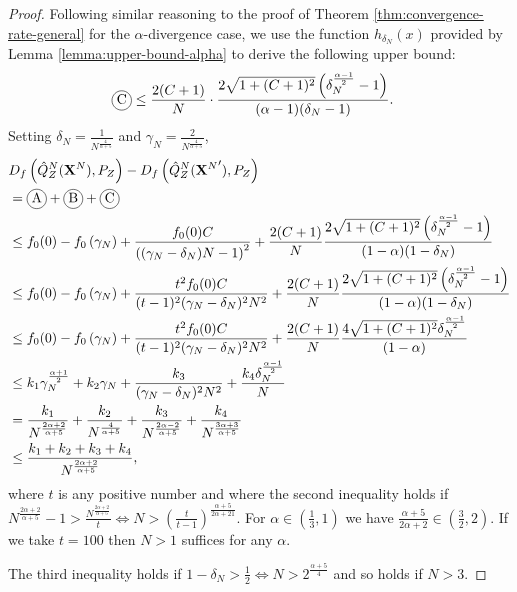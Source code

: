 \begin{proof}
Following similar reasoning to the proof of Theorem \ref{thm:convergence-rate-general} for the $\alpha$-divergence case, we use the function $h_{\delta_N}(x)$ provided by Lemma \ref{lemma:upper-bound-alpha} to derive the following upper bound:
%
\begin{align*}
    \encircle{C} &\leq \frac{2(C+1)}{N} \cdot \frac{2\sqrt{1+(C+1)^2}\left(\delta_N^\frac{\alpha-1}{2} - 1\right)}{(\alpha - 1) (\delta_N- 1)}.
\end{align*}
%
Setting $\delta_N = \frac{1}{N^\frac{4}{\alpha+5}}$ and $\gamma_N = \frac{2}{N^\frac{4}{\alpha+5}}$,
%
\begin{align*}
    &D_f\left( \hat{Q}_Z^N(\XN) , P_Z\right) - D_f\left( \hat{Q}_Z^N({\XN}') , P_Z\right) \\
    &= \encircle{A} + \encircle{B} + \encircle{C} \\
    &\leq f_0(0) - f_0\left(\gamma_N\right) + \frac{f_0(0)C}{\left((\gamma_N-\delta_N)N - 1\right)^2} + \frac{2(C+1)}{N}\frac{2\sqrt{1+(C+1)^2}\left(\delta_N^\frac{\alpha-1}{2} - 1\right)}{(1-\alpha) (1-\delta_N)} \\
    &\leq f_0(0) - f_0\left(\gamma_N\right) + \frac{t^2f_0(0)C}{(t-1)^2(\gamma_N-\delta_N)^2N^2} + \frac{2(C+1)}{N}\frac{2\sqrt{1+(C+1)^2}\left(\delta_N^\frac{\alpha-1}{2} - 1\right)}{(1-\alpha) (1-\delta_N)} \\
    &\leq f_0(0) - f_0\left(\gamma_N\right) + \frac{t^2f_0(0)C}{(t-1)^2(\gamma_N-\delta_N)^2N^2} + \frac{2(C+1)}{N}\frac{4\sqrt{1+(C+1)^2}\delta_N^\frac{\alpha-1}{2}}{(1-\alpha)} \\
    &\leq k_1 \gamma_N^{\frac{\alpha+1}{2}} + k_2 \gamma_N +\frac{k_3}{(\gamma_N-\delta_N)^2N^2} + \frac{k_4 \delta_N^\frac{\alpha-1}{2}}{N} \\
    &= \frac{k_1}{N^{\frac{2\alpha+2}{\alpha+5}}} + \frac{k_2}{N^\frac{4}{\alpha+5}} + \frac{k_3}{N^{\frac{2\alpha -2}{\alpha+5}}} +\frac{k_4}{N^{\frac{3\alpha+3}{\alpha+5}}} \\
    &\leq \frac{k_1+k_2+k_3 + k_4}{N^{\frac{2\alpha+2}{\alpha+5}}},
\end{align*}
where $t$ is any positive number and where the second inequality holds if $N^\frac{2\alpha+2}{\alpha+5} - 1 > \frac{N^\frac{2\alpha+2}{\alpha+5}}{t} \iff N > (\frac{t}{t-1})^{\frac{\alpha+5}{2\alpha+21}}$.
For $\alpha \in (\frac{1}{3}, 1)$ we have $\frac{\alpha+5}{2\alpha+2} \in (\frac{3}{2}, 2)$. 
If we take $t=100$ then $N> 1$ suffices for any $\alpha$.

The third inequality holds if $1-\delta_N > \frac{1}{2} \iff N>2^\frac{\alpha+5}{4}$ and so holds if $N>3$.


\end{proof}
